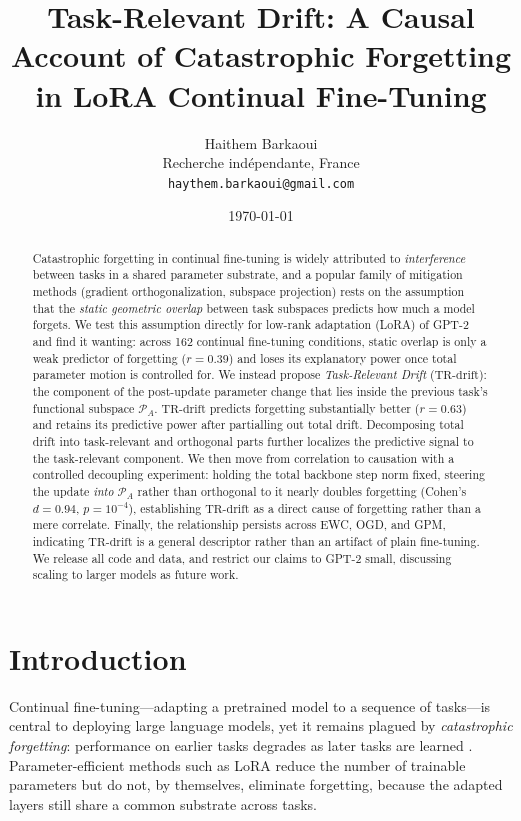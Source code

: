 \documentclass[11pt]{article}
\title{\textbf{Task-Relevant Drift: A Causal Account of Catastrophic
Forgetting in LoRA Continual Fine-Tuning}}
\author{
Haithem Barkaoui\\
Recherche indépendante, France\\
\texttt{haythem.barkaoui@gmail.com}
}
\date{\today}
\newcommand{\trdrift}{\mathrm{TR\text{-}drift}}
\newcommand{\PA}{\mathcal{P}_A}
\begin{document}
\maketitle

\begin{abstract}
Catastrophic forgetting in continual fine-tuning is widely attributed to
\emph{interference} between tasks in a shared parameter substrate, and a
popular family of mitigation methods (gradient orthogonalization, subspace
projection) rests on the assumption that the \emph{static geometric overlap}
between task subspaces predicts how much a model forgets. We test this
assumption directly for low-rank adaptation (LoRA) of GPT-2 and find it
wanting: across 162 continual fine-tuning conditions, static overlap is only a
weak predictor of forgetting ($r=0.39$) and loses its explanatory power once
total parameter motion is controlled for. We instead propose \emph{Task-Relevant
Drift} ($\trdrift$): the component of the post-update parameter change that lies
inside the previous task's functional subspace $\PA$. $\trdrift$ predicts
forgetting substantially better ($r=0.63$) and retains its predictive power
after partialling out total drift. Decomposing total drift into task-relevant
and orthogonal parts further localizes the predictive signal to the
task-relevant component. We then move from correlation to causation with a
controlled decoupling experiment: holding the total backbone step norm fixed,
steering the update \emph{into} $\PA$ rather than orthogonal to it nearly doubles
forgetting (Cohen's $d=0.94$, $p=10^{-4}$), establishing $\trdrift$ as a direct
cause of forgetting rather than a mere correlate. Finally, the relationship
persists across EWC, OGD, and GPM, indicating $\trdrift$ is a general descriptor
rather than an artifact of plain fine-tuning. We release all code and data, and
restrict our claims to GPT-2 small, discussing scaling to larger models as
future work.
\end{abstract}

\section{Introduction}
\label{sec:intro}

Continual fine-tuning---adapting a pretrained model to a sequence of tasks---is
central to deploying large language models, yet it remains plagued by
\emph{catastrophic forgetting}: performance on earlier tasks degrades as later
tasks are learned \citep{mccloskey1989catastrophic,kirkpatrick2017overcoming}.
Parameter-efficient methods such as LoRA \citep{hu2021lora} reduce the number of
trainable parameters but do not, by themselves, eliminate forgetting, because
the adapted layers still share a common substrate across tasks.
\end{document}
